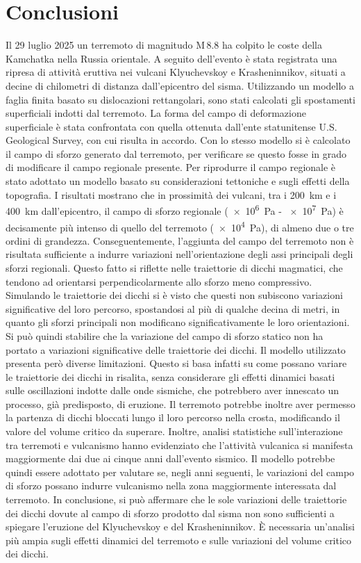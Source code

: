 \chapter{Conclusioni}

Il 29 luglio 2025 un terremoto di magnitudo \(\mathrm{M}\,8.8\) ha colpito le coste della Kamchatka nella Russia orientale. A seguito dell'evento è stata registrata una ripresa di attività eruttiva nei vulcani Klyuchevskoy e Krasheninnikov, situati a decine di chilometri di distanza dall'epicentro del sisma.
Utilizzando un modello a faglia finita basato su dislocazioni rettangolari, sono stati calcolati gli spostamenti superficiali indotti dal terremoto. La forma del campo di deformazione superficiale è stata confrontata con quella ottenuta dall'ente statunitense U.S. Geological Survey, con cui risulta in accordo. 
Con lo stesso modello si è calcolato il campo di sforzo generato dal terremoto, per verificare se questo fosse in grado di modificare il campo regionale presente. Per riprodurre il campo regionale è stato adottato un modello basato su considerazioni tettoniche e sugli effetti della topografia.
I risultati mostrano che in prossimità dei vulcani, tra i \qty{200}{\kilo\meter} e i \qty{400}{\kilo\meter} dall'epicentro, il campo di sforzo regionale (\qty{e6}{\pascal} - \qty{e7}{\pascal}) è decisamente più intenso di quello del terremoto (\qty{e4}{\pascal}), di almeno due o tre ordini di grandezza. Conseguentemente, l'aggiunta del campo del terremoto non è risultata sufficiente a indurre variazioni nell'orientazione degli assi principali degli sforzi regionali.
Questo fatto si riflette nelle traiettorie di dicchi magmatici, che tendono ad orientarsi perpendicolarmente allo sforzo meno compressivo. Simulando le traiettorie dei dicchi si è visto che questi non subiscono variazioni significative del loro percorso, spostandosi al più di qualche decina di metri, in quanto gli sforzi principali non modificano significativamente le loro orientazioni.
Si può quindi stabilire che la variazione del campo di sforzo statico non ha portato a variazioni significative delle traiettorie dei dicchi.
Il modello utilizzato presenta però diverse limitazioni.
Questo si basa infatti su come possano variare le traiettorie dei dicchi in risalita, senza considerare gli effetti dinamici basati sulle oscillazioni indotte dalle onde sismiche, che potrebbero aver innescato un processo, già predisposto, di eruzione.
Il terremoto potrebbe inoltre aver permesso la partenza di dicchi bloccati lungo il loro percorso nella crosta, modificando il valore del volume critico da superare.
Inoltre, analisi statistiche sull'interazione tra terremoti e vulcanismo hanno evidenziato che l'attività vulcanica si manifesta maggiormente dai due ai cinque anni dall'evento sismico. Il modello potrebbe quindi essere adottato per valutare se, negli anni seguenti, le variazioni del campo di sforzo possano indurre vulcanismo nella zona maggiormente interessata dal terremoto.
In conclusione, si può affermare che le sole variazioni delle traiettorie dei dicchi dovute al campo di sforzo prodotto dal sisma non sono sufficienti a spiegare l'eruzione del Klyuchevskoy e del Krasheninnikov. È necessaria un'analisi più ampia sugli effetti dinamici del terremoto e sulle variazioni del volume critico dei dicchi.
